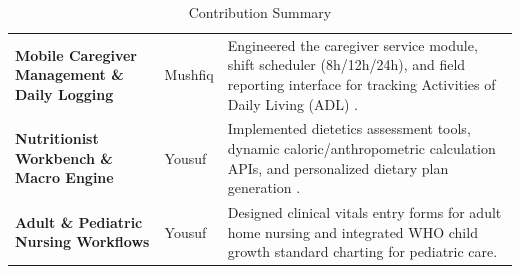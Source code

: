 \documentclass[lettersize,onecolumn,journal]{IEEEtran}
\begin{document}
\begin{table}[htbp]
\begin{tabular}{>{\RaggedRight\arraybackslash}p{4.0cm} >{\RaggedRight\arraybackslash}p{2.5cm} >{\RaggedRight\arraybackslash}p{7.5cm}}
			\textbf{Mobile Caregiver Management \& Daily Logging} & Mushfiq & Engineered the caregiver service module, shift scheduler (8h/12h/24h), and field reporting interface for tracking Activities of Daily Living (ADL) \cite{srs2026, telemedicine_homecare}. \\
			
			\textbf{Nutritionist Workbench \& Macro Engine} & Yousuf & Implemented dietetics assessment tools, dynamic caloric/anthropometric calculation APIs, and personalized dietary plan generation \cite{srs2026}. \\
			
			\textbf{Adult \& Pediatric Nursing Workflows} & Yousuf & Designed clinical vitals entry forms for adult home nursing and integrated WHO child growth standard charting \cite{who_child_growth} for pediatric care. \\
			\bottomrule
		\end{tabular}
		\vspace{0.5em}
		\caption{Contribution Summary}
		\label{tab:contributions}
	\end{table}
	
\end{document}
